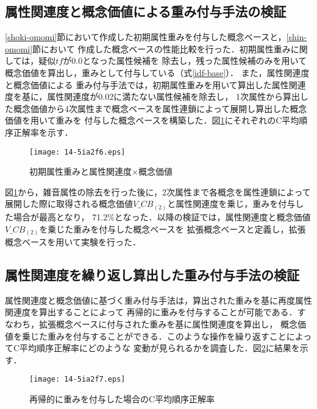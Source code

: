 \documentclass[japanese]{jnlp_1.3e}
\begin{document}
\subsection{属性関連度と概念価値による重み付与手法の検証}

\ref{shoki-omomi}節において作成した初期属性重みを付与した概念ベースと，\ref{shin-omomi}節において
作成した概念ベースの性能比較を行った．初期属性重みに関しては，疑似$\mathit{tf}$が0.0となった属性候補を
除去し，残った属性候補のみを用いて概念価値を算出し，重みとして付与している（式\ref{idf-base}）．
また，属性関連度と概念価値による
重み付与手法では，初期属性重みを用いて算出した属性関連度を基に，属性関連度が$0.02$に満たない属性候補を除去し，
1次属性から算出した概念価値から4次属性まで概念ベースを属性連鎖によって展開し算出した概念価値を用いて重みを
付与した概念ベースを構築した．図\ref{fig:shoki-kanrendo-comp}にそれぞれのC平均順序正解率を示す．

\begin{figure}[t]
	\begin{center}
	\texttt{[image: 14-5ia2f6.eps]}
		\caption{初期属性重みと属性関連度$\times$概念価値}
		\label{fig:shoki-kanrendo-comp}
	\end{center}
\end{figure}

図\ref{fig:shoki-kanrendo-comp}から，雑音属性の除去を行った後に，2次属性まで各概念を属性連鎖によって
展開した際に取得される概念価値$V\_\mathit{CB}_{(2)}$と属性関連度を乗じ，重みを付与した場合が最高となり，
71.2\%となった．以降の検証では，属性関連度と概念価値$V\_\mathit{CB}_{(2)}$を乗じた重みを付与した概念ベースを
拡張概念ベースと定義し，拡張概念ベースを用いて実験を行った．



\subsection{属性関連度を繰り返し算出した重み付与手法の検証}

属性関連度と概念価値に基づく重み付与手法は，算出された重みを基に再度属性関連度を算出することによって
再帰的に重みを付与することが可能である．すなわち，拡張概念ベースに付与された重みを基に属性関連度を算出し，
概念価値を乗じた重みを付与することができる．このような操作を繰り返すことによってC平均順序正解率にどのような
変動が見られるかを調査した．図\ref{reverse}に結果を示す．

\begin{figure}[b]
	\begin{center}
	\texttt{[image: 14-5ia2f7.eps]}
		\caption{再帰的に重みを付与した場合のC平均順序正解率}
		\label{reverse}
	\end{center}
\end{figure}
\end{document}
